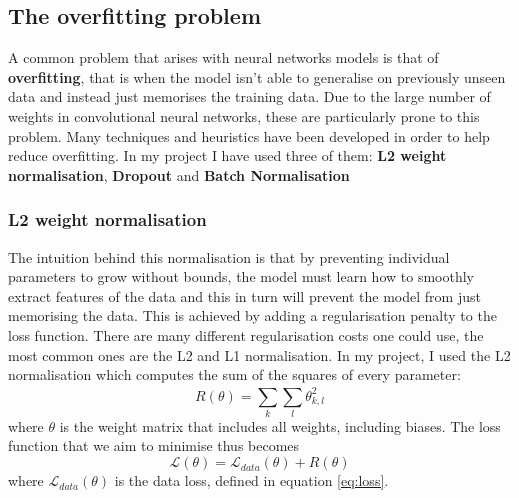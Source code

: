 \documentclass[12pt,a4paper,twoside,openright]{report}
\begin{document}
\subsection{The overfitting problem}
A common problem that arises with neural networks models is that of \textbf{overfitting}, that is when the model isn't able to generalise on previously unseen data and instead just memorises the training data. Due to the large number of weights in convolutional neural networks, these are particularly prone to this problem. Many techniques and heuristics have been developed in order to help reduce overfitting. In my project I have used three of them: \textbf{L2 weight normalisation}, \textbf{Dropout} and \textbf{Batch Normalisation}
\subsubsection{\textbf{L2} weight normalisation}
The intuition behind this normalisation is that by preventing individual parameters to grow without bounds, the model must learn how to smoothly extract features of the data and this in turn will prevent the model from just memorising the data. This is achieved by adding a regularisation penalty to the loss function. There are many different regularisation costs one could use, the most common ones are the L2 and L1 normalisation. In my project, I used the L2 normalisation which computes the sum of the squares of every parameter:
\begin{equation}
	R(\theta) = \sum_{k}^{} \sum_{l}^{} \theta_{k,l}^2
\end{equation} 
where $\theta$ is the weight matrix that includes all weights, including biases.
The loss function that we aim to minimise thus becomes
\begin{equation}
	\mathcal{L}(\theta) = \mathcal{L}_{data}(\theta) + R(\theta) 
\end{equation}
where $\mathcal{L}_{data}(\theta)$ is the data loss, defined in equation \ref{eq:loss}. 
\end{document}
